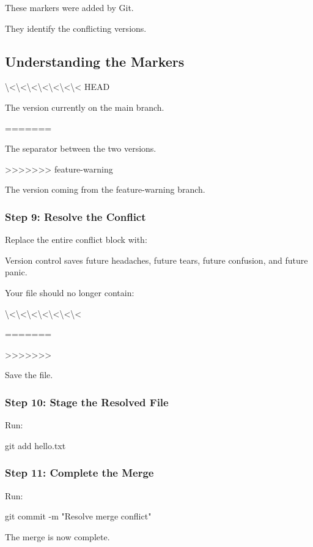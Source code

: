 \documentclass{csc2059practical}
\begin{document}
These markers were added by Git.

They identify the conflicting versions.

\subsection{Understanding the Markers}
\textbackslash{}<\textbackslash{}<\textbackslash{}<\textbackslash{}<\textbackslash{}<\textbackslash{}<\textbackslash{}< HEAD

The version currently on the main branch.

\begin{terminalplain}
=======
\end{terminalplain}
The separator between the two versions.

>>>>>>> feature-warning

The version coming from the feature-warning branch.

\subsubsection{Step 9: Resolve the Conflict}
Replace the entire conflict block with:

\begin{terminalplain}
Version control saves future headaches, future tears, future confusion, and future panic.
\end{terminalplain}
Your file should no longer contain:

\textbackslash{}<\textbackslash{}<\textbackslash{}<\textbackslash{}<\textbackslash{}<\textbackslash{}<\textbackslash{}<

\begin{terminalplain}
=======
\end{terminalplain}
>>>>>>>

Save the file.

\subsubsection{Step 10: Stage the Resolved File}
Run:

\begin{terminalplain}
git add hello.txt
\end{terminalplain}
\subsubsection{Step 11: Complete the Merge}
Run:

\begin{terminalplain}
git commit -m "Resolve merge conflict"
\end{terminalplain}
The merge is now complete.
\end{document}
